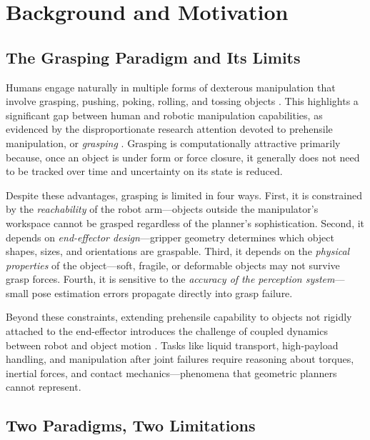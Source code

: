 \section{Background and Motivation}
\label{sec:intro:background}

\subsection{The Grasping Paradigm and Its Limits}
\label{sec:intro:grasping}

Humans engage naturally in multiple forms of dexterous manipulation that involve grasping, pushing, poking, rolling, and tossing objects \cite{bullock2011classifying}.
This highlights a significant gap between human and robotic manipulation capabilities, as evidenced by the disproportionate research attention devoted to prehensile manipulation, or \textit{grasping} \cite{billard2019trends}.
Grasping is computationally attractive primarily because, once an object is under form or force closure, it generally does not need to be tracked over time and uncertainty on its state is reduced.

Despite these advantages, grasping is limited in four ways.
First, it is constrained by the \textit{reachability} of the robot arm---objects outside the manipulator's workspace cannot be grasped regardless of the planner's sophistication.
Second, it depends on \textit{end-effector design}---gripper geometry determines which object shapes, sizes, and orientations are graspable.
Third, it depends on the \textit{physical properties} of the object---soft, fragile, or deformable objects may not survive grasp forces.
Fourth, it is sensitive to the \textit{accuracy of the perception system}---small pose estimation errors propagate directly into grasp failure.

Beyond these constraints, extending prehensile capability to objects not rigidly attached to the end-effector introduces the challenge of coupled dynamics between robot and object motion \cite{yin2021modeling,ichnowski2022gomp}.
Tasks like liquid transport, high-payload handling, and manipulation after joint failures require reasoning about torques, inertial forces, and contact mechanics---phenomena that geometric planners cannot represent.

\subsection{Two Paradigms, Two Limitations}
\label{sec:intro:paradigms}

